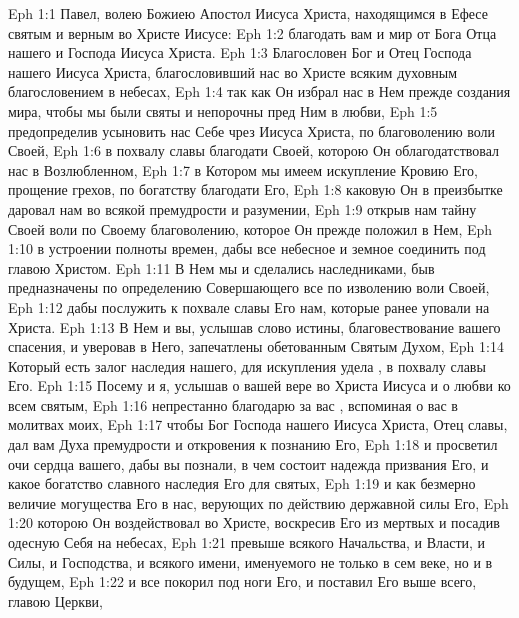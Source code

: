 \vs Eph 1:1 Павел, волею Божиею Апостол Иисуса Христа, находящимся в Ефесе святым и верным во Христе Иисусе:
\vs Eph 1:2 благодать вам и мир от Бога Отца нашего и Господа Иисуса Христа.
\rsbpar\vs Eph 1:3 Благословен Бог и Отец Господа нашего Иисуса Христа, благословивший нас во Христе всяким духовным благословением в небесах,
\vs Eph 1:4 так как Он избрал нас в Нем прежде создания мира, чтобы мы были святы и непорочны пред Ним в любви,
\vs Eph 1:5 предопределив усыновить нас Себе чрез Иисуса Христа, по благоволению воли Своей,
\vs Eph 1:6 в похвалу славы благодати Своей, которою Он облагодатствовал нас в Возлюбленном,
\vs Eph 1:7 в Котором мы имеем искупление Кровию Его, прощение грехов, по богатству благодати Его,
\vs Eph 1:8 каковую Он в преизбытке даровал нам во всякой премудрости и разумении,
\vs Eph 1:9 открыв нам тайну Своей воли по Своему благоволению, которое Он прежде положил в Нем,
\vs Eph 1:10 в устроении полноты времен, дабы все небесное и земное соединить под главою Христом.
\vs Eph 1:11 В Нем мы и сделались наследниками, быв предназначены  по определению Совершающего все по изволению воли Своей,
\vs Eph 1:12 дабы послужить к похвале славы Его нам, которые ранее уповали на Христа.
\vs Eph 1:13 В Нем и вы, услышав слово истины, благовествование вашего спасения, и уверовав в Него, запечатлены обетованным Святым Духом,
\vs Eph 1:14 Который есть залог наследия нашего, для искупления удела , в похвалу славы Его.
\rsbpar\vs Eph 1:15 Посему и я, услышав о вашей вере во Христа Иисуса и о любви ко всем святым,
\vs Eph 1:16 непрестанно благодарю за вас , вспоминая о вас в молитвах моих,
\vs Eph 1:17 чтобы Бог Господа нашего Иисуса Христа, Отец славы, дал вам Духа премудрости и откровения к познанию Его,
\vs Eph 1:18 и просветил очи сердца вашего, дабы вы познали, в чем состоит надежда призвания Его, и какое богатство славного наследия Его для святых,
\vs Eph 1:19 и как безмерно величие могущества Его в нас, верующих по действию державной силы Его,
\vs Eph 1:20 которою Он воздействовал во Христе, воскресив Его из мертвых и посадив одесную Себя на небесах,
\vs Eph 1:21 превыше всякого Начальства, и Власти, и Силы, и Господства, и всякого имени, именуемого не только в сем веке, но и в будущем,
\vs Eph 1:22 и все покорил под ноги Его, и поставил Его выше всего, главою Церкви,
